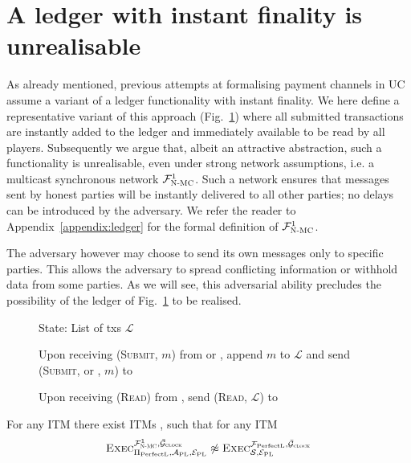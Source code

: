 \section{A ledger with instant finality is unrealisable}
\label{sec:perfect-ledger}
  As already mentioned, previous attempts at formalising payment channels in
  UC~\cite{DBLP:conf/ccs/DziembowskiFH18,Malavolta:2017:CPP:3133956.3134096,sprites,perun}
  assume a variant of a ledger functionality with instant finality. We here
  define a representative variant of this approach \perfectledger{}
  (Fig.~\ref{fig:perfectledger:func}) where all submitted transactions are
  instantly added to the ledger and immediately available to be read by all
  players. Subsequently we argue that, albeit an attractive abstraction, such a
  functionality is unrealisable, even under strong network assumptions, i.e. a
  multicast synchronous network $\mathcal{F}_{\textsc{N-MC}}^1$. Such a network ensures that
  messages sent by honest parties will be instantly delivered to all other
  parties; no delays can be introduced by the adversary. We refer the reader to
  Appendix~\ref{appendix:ledger} for the formal definition of $\mathcal{F}_{\textsc{N-MC}}^1$.

  The adversary however may choose to send its own messages only to specific
  parties. This allows the adversary to spread conflicting information or
  withhold data from some parties. As we will see, this adversarial ability
  precludes the possibility of the ledger of Fig.~\ref{fig:perfectledger:func}
  to be realised.

  \begin{figure}[H]
    \begin{systembox}{\perfectledger}
      \begin{algorithmic}[1]
        \State State: List of txs $\mathcal{L}$
        \Statex

        \State Upon receiving (\textsc{Submit}, $m$) from \alice{} or
        \adversary, append $m$ to $\mathcal{L}$ and send (\textsc{Submit},
        \alice{} or \adversary, $m$) to \adversary
        \Statex

        \State Upon receiving (\textsc{Read}) from \alice, send (\textsc{Read},
        $\mathcal{L}$) to \alice
      \end{algorithmic}
    \end{systembox}
    \caption{}
    \label{fig:perfectledger:func}
  \end{figure}

  \begin{theorem}
    \label{theorem:perfectledger}
    For any ITM \perfectprot{} there exist ITMs \perfectenv,
    \perfectadv{} such that for any ITM \simulator
    \begin{equation*}
      \textsc{Exec}^{\mathcal{F}_{\textsc{N-MC}}^1, \bar{\mathcal{G}}_{\textsc{clock}}}_{\Pi_{\mathrm{PerfectL}}, \mathcal{A}_{\mathrm{PL}},
      \mathcal{E}_{\mathrm{PL}}} \not\approx \textsc{Exec}^{\mathcal{F}_{\mathrm{PerfectL}},
      \bar{\mathcal{G}}_{\textsc{clock}}}_{\mathcal{S}, \mathcal{E}_{\mathrm{PL}}}
    \end{equation*}
  \end{theorem}

